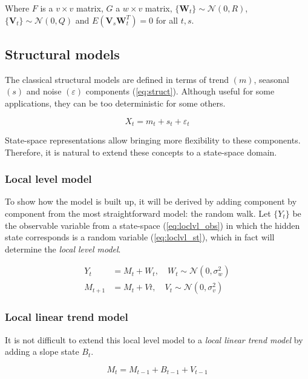 Where $F$ is a $v \times v$ matrix, $G$ a $w \times v$ matrix, $\{\bm{W}_t\} \sim \mathcal{N}(0,R)$, $\{\bm{V}_t\} \sim \mathcal{N}(0,Q)$ and $E(\bm{V}_s\bm{W}^T_t) = 0$ for all $t, s$.

\subsection{Structural models}

The classical structural models are defined in terms of trend $(m)$, seasonal $(s)$ and noise $(\varepsilon)$ components (\ref{eq:struct}). Although useful for some applications, they can be too deterministic for some others.

\begin{equation}\label{eq:struct}
	X_t = m_t + s_t + \varepsilon_t
\end{equation}

State-space representations allow bringing more flexibility to these components. Therefore, it is natural to extend these concepts to a state-space domain. 

\subsubsection*{Local level model}

To show how the model is built up, it will be derived by adding component by component from the most straightforward model: the random walk. Let $\{Y_t\}$ be the observable variable from a state-space (\ref{eq:loclvl_obs}) in which the hidden state corresponds is a random variable (\ref{eq:loclvl_st}), which in fact will determine the \emph{local level model}\cite{brockwell2016introduction}.

\begin{align}
	Y_t		&= M_t + W_t, \quad W_t \sim \mathcal{N}(0,\sigma^2_w) \label{eq:loclvl_obs} \\
	M_{t+1}	&= M_t + Vt, \quad V_t \sim \mathcal{N}(0,\sigma^2_v) \label{eq:loclvl_st}
\end{align}

\subsubsection*{Local linear trend model}

It is not difficult to extend this local level model to a \emph{local linear trend model} by adding a slope state $B_t$. 

\begin{equation}
	M_t = M_{t-1} + B_{t-1} + V_{t-1} \label{eq:loclintrend}
\end{equation}

